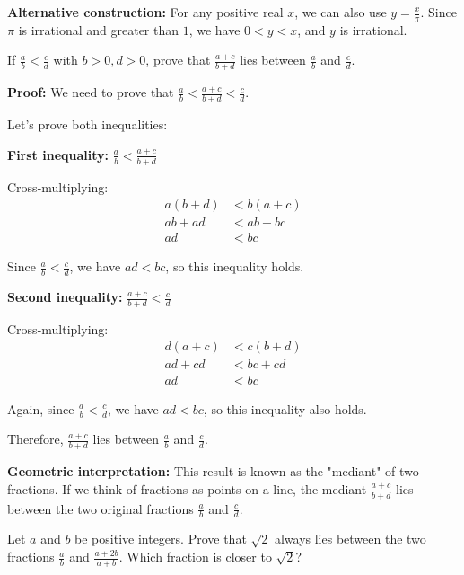 \textbf{Alternative construction:}
For any positive real $x$, we can also use $y = \frac{x}{\pi}$. Since $\pi$ is irrational and greater than $1$, we have $0 < y < x$, and $y$ is irrational.

\begin{problembox}
If $\frac{a}{b} < \frac{c}{d}$ with $b > 0, d > 0$, prove that $\frac{a + c}{b + d}$ lies between $\frac{a}{b}$ and $\frac{c}{d}$.
\end{problembox}

\textbf{Proof:}
We need to prove that $\frac{a}{b} < \frac{a + c}{b + d} < \frac{c}{d}$.

Let's prove both inequalities:

\textbf{First inequality:} $\frac{a}{b} < \frac{a + c}{b + d}$

Cross-multiplying:
\begin{align*}
a(b + d) &< b(a + c) \\
ab + ad &< ab + bc \\
ad &< bc
\end{align*}

Since $\frac{a}{b} < \frac{c}{d}$, we have $ad < bc$, so this inequality holds.

\textbf{Second inequality:} $\frac{a + c}{b + d} < \frac{c}{d}$

Cross-multiplying:
\begin{align*}
d(a + c) &< c(b + d) \\
ad + cd &< bc + cd \\
ad &< bc
\end{align*}

Again, since $\frac{a}{b} < \frac{c}{d}$, we have $ad < bc$, so this inequality also holds.

Therefore, $\frac{a + c}{b + d}$ lies between $\frac{a}{b}$ and $\frac{c}{d}$.

\textbf{Geometric interpretation:}
This result is known as the "mediant" of two fractions. If we think of fractions as points on a line, the mediant $\frac{a + c}{b + d}$ lies between the two original fractions $\frac{a}{b}$ and $\frac{c}{d}$.

\begin{problembox}
Let $a$ and $b$ be positive integers. Prove that $\sqrt{2}$ always lies between the two fractions $\frac{a}{b}$ and $\frac{a + 2b}{a + b}$. Which fraction is closer to $\sqrt{2}$?
\end{problembox}

